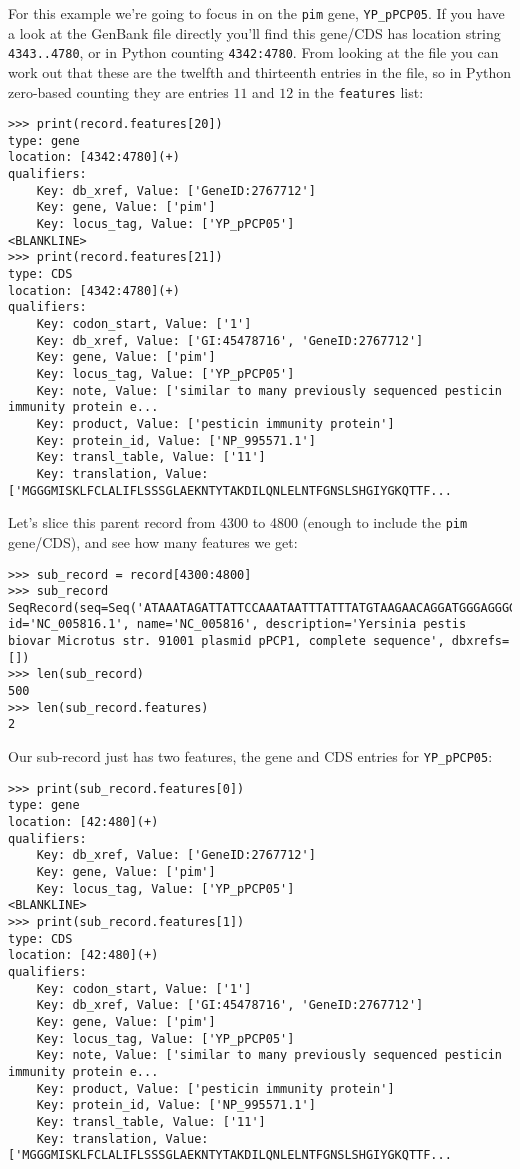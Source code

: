 For this example we're going to focus in on the \verb|pim| gene, \verb|YP_pPCP05|.
If you have a look at the GenBank file directly you'll find this gene/CDS has
location string \texttt{4343..4780}, or in Python counting \texttt{4342:4780}.
From looking at the file you can work out that these are the twelfth and
thirteenth entries in the file, so in Python zero-based counting they are
entries $11$ and $12$ in the \texttt{features} list:

\begin{verbatim}
>>> print(record.features[20])
type: gene
location: [4342:4780](+)
qualifiers:
    Key: db_xref, Value: ['GeneID:2767712']
    Key: gene, Value: ['pim']
    Key: locus_tag, Value: ['YP_pPCP05']
<BLANKLINE>
>>> print(record.features[21])
type: CDS
location: [4342:4780](+)
qualifiers:
    Key: codon_start, Value: ['1']
    Key: db_xref, Value: ['GI:45478716', 'GeneID:2767712']
    Key: gene, Value: ['pim']
    Key: locus_tag, Value: ['YP_pPCP05']
    Key: note, Value: ['similar to many previously sequenced pesticin immunity protein e...
    Key: product, Value: ['pesticin immunity protein']
    Key: protein_id, Value: ['NP_995571.1']
    Key: transl_table, Value: ['11']
    Key: translation, Value: ['MGGGMISKLFCLALIFLSSSGLAEKNTYTAKDILQNLELNTFGNSLSHGIYGKQTTF...
\end{verbatim}

Let's slice this parent record from 4300 to 4800 (enough to include the \verb|pim|
gene/CDS), and see how many features we get:

\begin{verbatim}
>>> sub_record = record[4300:4800]
>>> sub_record
SeqRecord(seq=Seq('ATAAATAGATTATTCCAAATAATTTATTTATGTAAGAACAGGATGGGAGGGGGA...TTA'), id='NC_005816.1', name='NC_005816', description='Yersinia pestis biovar Microtus str. 91001 plasmid pPCP1, complete sequence', dbxrefs=[])
>>> len(sub_record)
500
>>> len(sub_record.features)
2
\end{verbatim}

Our sub-record just has two features, the gene and CDS entries for \verb|YP_pPCP05|:

\begin{verbatim}
>>> print(sub_record.features[0])
type: gene
location: [42:480](+)
qualifiers:
    Key: db_xref, Value: ['GeneID:2767712']
    Key: gene, Value: ['pim']
    Key: locus_tag, Value: ['YP_pPCP05']
<BLANKLINE>
>>> print(sub_record.features[1])
type: CDS
location: [42:480](+)
qualifiers:
    Key: codon_start, Value: ['1']
    Key: db_xref, Value: ['GI:45478716', 'GeneID:2767712']
    Key: gene, Value: ['pim']
    Key: locus_tag, Value: ['YP_pPCP05']
    Key: note, Value: ['similar to many previously sequenced pesticin immunity protein e...
    Key: product, Value: ['pesticin immunity protein']
    Key: protein_id, Value: ['NP_995571.1']
    Key: transl_table, Value: ['11']
    Key: translation, Value: ['MGGGMISKLFCLALIFLSSSGLAEKNTYTAKDILQNLELNTFGNSLSHGIYGKQTTF...
\end{verbatim}


